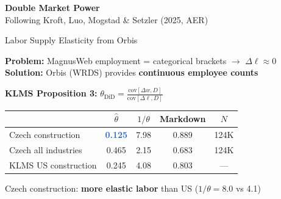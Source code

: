 \documentclass[aspectratio=169,11pt]{beamer}
\newcommand{\accenttext}[1]{\textcolor{accent}{\textbf{#1}}}
\newcommand{\highlighttext}[1]{\textcolor{highlight}{\textbf{#1}}}
\begin{document}

\begin{frame}{}
\begin{center}
{\Large\bfseries Double Market Power}\\[8pt]
{\normalsize Following Kroft, Luo, Mogstad \& Setzler (2025, AER)}
\end{center}
\end{frame}

\begin{frame}{Labor Supply Elasticity from Orbis}

\textbf{Problem:} MagnusWeb employment = categorical brackets $\rightarrow$ $\Delta\ell \approx 0$ \\
\textbf{Solution:} Orbis (WRDS) provides \accenttext{continuous employee counts}

\pause
\medskip
\textbf{KLMS Proposition 3:} $\theta_{\text{DiD}} = \frac{\text{cov}[\Delta w, D]}{\text{cov}[\Delta \ell, D]}$

\medskip
\begin{center}
\begin{tabular}{lcccc}
\toprule
& $\hat{\theta}$ & $1/\theta$ & Markdown & $N$ \\
\midrule
Czech construction & \highlighttext{0.125} & 7.98 & 0.889 & 124K \\
Czech all industries & 0.465 & 2.15 & 0.683 & 124K \\
\textcolor{muted}{KLMS US construction} & \textcolor{muted}{0.245} & \textcolor{muted}{4.08} & \textcolor{muted}{0.803} & --- \\
\bottomrule
\end{tabular}
\end{center}

\pause
Czech construction: \accenttext{more elastic labor} than US ($1/\theta = 8.0$ vs 4.1)

\end{frame}
\end{document}
